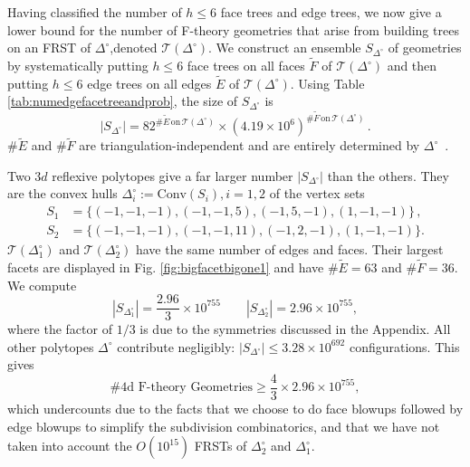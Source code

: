 \documentclass[aps,prl,twocolumn, superscriptaddress,groupedaddress,nofootinbib]{revtex4-1}
\newcommand{\sdoc}{S_{\Delta_1^\circ}}
\newcommand{\sdtc}{S_{\Delta_2^\circ}}
\newcommand{\doc}{{\Delta_1^\circ}}
\newcommand{\dtc}{{\Delta_2^\circ}}
\begin{document}
\vspace{.5cm}
Having classified the number of $h\leq 6$ face trees and edge trees, we now give a lower bound for
the number of F-theory geometries that arise from building trees on an FRST of 
$\Delta^\circ$,denoted $\mathcal{T}(\Delta^\circ)$. 
We construct an ensemble $S_{\Delta^\circ}$ of geometries by systematically putting $h\leq 6$ face trees on all
faces $\tilde F$ of $\mathcal{T}(\Delta^\circ)$ and then putting $h\leq 6$ edge trees on
all edges $\tilde E$ of $\mathcal{T}(\Delta^\circ)$. Using Table \ref{tab:numedgefacetreeandprob}, the size of $S_{\Delta^\circ}$ is 
\begin{equation}
|S_{\Delta^\circ}| = 82^{\# \tilde E \, \text{on} \, \mathcal{T}(\Delta^\circ)} \times (4.19\times 10^6)^{\# \tilde F \, \text{on} \, \mathcal{T}(\Delta^\circ)}\, . 
\end{equation}
$\# \tilde E$ and $\# \tilde F $ are triangulation-independent and are entirely determined by $\Delta^\circ$~\cite{DeLoera:2010:TSA:1952022}.


Two $3d$ reflexive polytopes give a far larger number $|S_{\Delta^\circ}|$
than the others. They
are  the convex hulls $\Delta_i^\circ := \text{Conv}(S_i), i=1,2$ of the
vertex sets
\begin{align} 
S_1 &= \{ (-1,-1,-1),(-1,-1,5),(-1,5,-1),(1,-1,-1)\}\, , \nonumber \\
S_2 &= \{ (-1,-1,-1),(-1,-1,11),(-1,2,-1),(1,-1,-1)\}. \nonumber
\end{align}
$\mathcal{T}(\doc)$ and $\mathcal{T}(\dtc)$ have the same number of edges and faces. 
Their largest facets are displayed in  Fig. \ref{fig:bigfacetbigone1} and have $\# \tilde E = 63$ and $\# \tilde F=36$. We compute
\begin{equation}
|\sdoc| = \frac{2.96}{3} \times 10^{755} \qquad |\sdtc| = 2.96 \times 10^{755},
\label{eqn:sdocsdtccounts}
\end{equation}
where the factor of $1/3$ is due to the symmetries discussed in the Appendix.
All other polytopes $\Delta^\circ$ contribute negligibly:
$|S_{\Delta^\circ}| \leq 3.28\times 10^{692}$ 
configurations. This gives
\begin{equation}
\text{\# 4d F-theory Geometries} \geq \frac43 \times 2.96 \times 10^{755},
\end{equation}
which undercounts due to the facts that we choose to do face blowups followed by
edge blowups to simplify the subdivision combinatorics, and
that we have not taken into account the $O(10^{15})$ FRSTs of 
$\dtc$ and $\doc$. 
\end{document}
